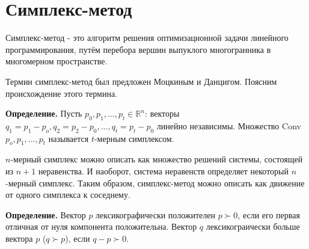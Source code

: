 \documentclass[a4paper,14pt,russian]{extreport}
\begin{document}
\section{Симплекс-метод}
Симплекс-метод - это алгоритм решения оптимизационной задачи линейного программирования, путём перебора вершин выпуклого многогранника в многомерном пространстве.
\par
Термин симплекс-метод был предложен Моцкиным и Данцигом. Поясним происхождение этого термина. 
\par
{\bf Определение.} Пусть $p_0,p_1,...,p_t \in \mathbb{R}^n$: векторы $q_1=p_1-p_o,q_2=p_2-p_0,...,q_t=p_t-p_0$ линейно независимы. Множество Conv{$p_o,p_1,...,p_t$} называется $t$-мерным симплексом. 
\par 
$n$-мерный симплекс можно описать как множество решений системы, состоящей из $n+1$ неравенства. И наоборот, система неравенств определяет некоторый $n$-мерный симплекс. Таким образом, симплекс-метод можно описать как движение от одного симплекса к соседнему. 
\par
{\bf Определение.} Вектор $p$ лексикографически положителен $p \succ 0$, если его первая отличная от нуля компонента положительна. Вектор $q$ лексикограически больше вектора $p$ ($q \succ p$), если $q-p \succ 0$.
\end{document}
